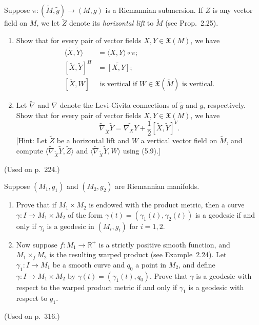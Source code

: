 \begin{exercise}
\label{prob:riemannian-submersion-connection}

Suppose $\pi: (\tilde{M}, \tilde{g}) \to (M, g)$ is a Riemannian submersion. If $Z$ is any vector field on $M$, we let $\tilde{Z}$ denote its \emph{horizontal lift} to $\tilde{M}$ (see Prop.~2.25).
\begin{enumerate}
\item[(a)] Show that for every pair of vector fields $X, Y \in \mathfrak{X}(M)$, we have
\begin{align*}
\langle \tilde{X}, \tilde{Y} \rangle &= \langle X, Y \rangle \circ \pi; \\
[\tilde{X}, \tilde{Y}]^H &= \widetilde{[X, Y]}; \\
[\tilde{X}, W] &\text{ is vertical if } W \in \mathfrak{X}(\tilde{M}) \text{ is vertical.}
\end{align*}
\item[(b)] Let $\tilde{\nabla}$ and $\nabla$ denote the Levi-Civita connections of $\tilde{g}$ and $g$, respectively. Show that for every pair of vector fields $X, Y \in \mathfrak{X}(M)$, we have
\begin{equation}
\tilde{\nabla}_{\tilde{X}} \tilde{Y} = \widetilde{\nabla_X Y} + \frac{1}{2} [\tilde{X}, \tilde{Y}]^V. \tag{5.27}
\end{equation}
[Hint: Let $\tilde{Z}$ be a horizontal lift and $W$ a vertical vector field on $\tilde{M}$, and compute $\langle \tilde{\nabla}_{\tilde{X}} \tilde{Y}, \tilde{Z} \rangle$ and $\langle \tilde{\nabla}_{\tilde{X}} \tilde{Y}, W \rangle$ using (5.9).]
\end{enumerate}
(Used on p.\ 224.)
\end{exercise}

\begin{exercise}
\label{prob:geodesics-product-warped-metrics}
\label{prob:geodesic-warped-product}

Suppose $(M_1, g_1)$ and $(M_2, g_2)$ are Riemannian manifolds.
\begin{enumerate}
\item[(a)] Prove that if $M_1 \times M_2$ is endowed with the product metric, then a curve $\gamma: I \to M_1 \times M_2$ of the form $\gamma(t) = (\gamma_1(t), \gamma_2(t))$ is a geodesic if and only if $\gamma_i$ is a geodesic in $(M_i, g_i)$ for $i = 1, 2$.
\item[(b)] Now suppose $f: M_1 \to \mathbb{R}^+$ is a strictly positive smooth function, and $M_1 \times_f M_2$ is the resulting warped product (see Example~2.24). Let $\gamma_1: I \to M_1$ be a smooth curve and $q_0$ a point in $M_2$, and define $\gamma : I \to M_1 \times M_2$ by $\gamma(t) = (\gamma_1(t), q_0)$. Prove that $\gamma$ is a geodesic with respect to the warped product metric if and only if $\gamma_1$ is a geodesic with respect to $g_1$.
\end{enumerate}
(Used on p.\ 316.)
\end{exercise}

